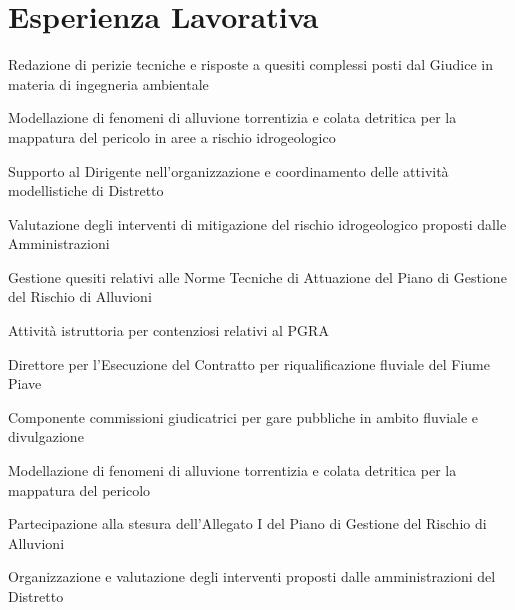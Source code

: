 
\section{Esperienza Lavorativa}

\begin{tightemize}
\item Redazione di perizie tecniche e risposte a quesiti complessi posti dal Giudice in materia di ingegneria ambientale
\end{tightemize}
\sectionsep

\begin{tightemize}
\item Modellazione di fenomeni di alluvione torrentizia e colata detritica per la mappatura del pericolo in aree a rischio idrogeologico
\item Supporto al Dirigente nell'organizzazione e coordinamento delle attività modellistiche di Distretto
\item Valutazione degli interventi di mitigazione del rischio idrogeologico proposti dalle Amministrazioni
\item Gestione quesiti relativi alle Norme Tecniche di Attuazione del Piano di Gestione del Rischio di Alluvioni
\item Attività istruttoria per contenziosi relativi al PGRA
\item Direttore per l'Esecuzione del Contratto per riqualificazione fluviale del Fiume Piave
\item Componente commissioni giudicatrici per gare pubbliche in ambito fluviale e divulgazione
\end{tightemize}
\sectionsep

\begin{tightemize}
\item Modellazione di fenomeni di alluvione torrentizia e colata detritica per la mappatura del pericolo
\item Partecipazione alla stesura dell'Allegato I del Piano di Gestione del Rischio di Alluvioni
\item Organizzazione e valutazione degli interventi proposti dalle amministrazioni del Distretto
\end{tightemize}
\sectionsep

